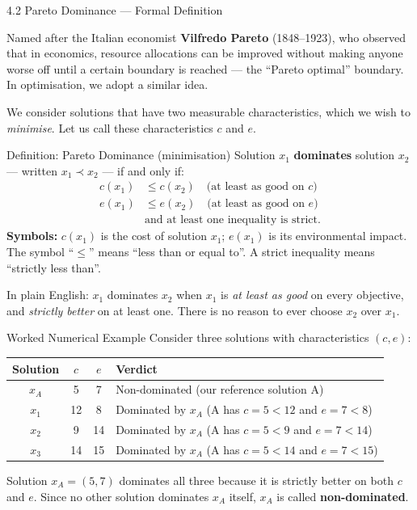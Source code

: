\documentclass[aspectratio=169,10pt]{beamer}
\begin{document}
\begin{frame}[allowframebreaks]{4.2 Pareto Dominance --- Formal Definition}

  Named after the Italian economist \textbf{Vilfredo Pareto} (1848--1923), who
  observed that in economics, resource allocations can be improved without
  making anyone worse off until a certain boundary is reached --- the
  ``Pareto optimal'' boundary.  In optimisation, we adopt a similar idea.

  We consider solutions that have two measurable characteristics, which we wish
  to \emph{minimise}.  Let us call these characteristics $c$ and $e$.

  \begin{block}{Definition: Pareto Dominance (minimisation)}
    Solution $x_1$ \textbf{dominates} solution $x_2$ --- written $x_1 \prec x_2$
    --- if and only if:
    \begin{align}
      c(x_1) &\leq c(x_2) \quad \text{(at least as good on } c \text{)} \\
      e(x_1) &\leq e(x_2) \quad \text{(at least as good on } e \text{)} \\
              &\text{and at least one inequality is strict.}
    \end{align}
    \textbf{Symbols:} $c(x_1)$ is the cost of solution $x_1$; $e(x_1)$ is its
    environmental impact.  The symbol ``$\leq$'' means ``less than or equal to''.
    A strict inequality means ``strictly less than''.
  \end{block}

  In plain English: $x_1$ dominates $x_2$ when $x_1$ is \emph{at least as good}
  on every objective, and \emph{strictly better} on at least one.  There is no
  reason to ever choose $x_2$ over $x_1$.

  \framebreak

  \begin{exampleblock}{Worked Numerical Example}
    Consider three solutions with characteristics $(c, e)$:
    \begin{center}
      \begin{tabular}{ccc l}
        \toprule
        Solution & $c$ & $e$ & Verdict \\
        \midrule
        $x_A$ & 5  & 7  & Non-dominated (our reference solution A) \\
        $x_1$ & 12 & 8  & Dominated by $x_A$ (A has $c=5 < 12$ and $e=7 < 8$) \\
        $x_2$ & 9  & 14 & Dominated by $x_A$ (A has $c=5 < 9$ and $e=7 < 14$) \\
        $x_3$ & 14 & 15 & Dominated by $x_A$ (A has $c=5 < 14$ and $e=7 < 15$) \\
        \bottomrule
      \end{tabular}
    \end{center}
    Solution $x_A = (5, 7)$ dominates all three because it is strictly better on
    both $c$ and $e$.  Since no other solution dominates $x_A$ itself, $x_A$ is
    called \textbf{non-dominated}.
  \end{exampleblock}


\end{frame}
\end{document}
